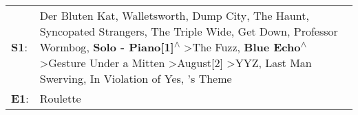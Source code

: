 \begin{supertabular}{p{0.03\textwidth}p{0.92\textwidth}}
 \textbf{S1}:  &  Der Bluten Kat\textsuperscript{}, \enspace Walletsworth\textsuperscript{}, \enspace Dump City\textsuperscript{}, \enspace The Haunt\textsuperscript{}, \enspace Syncopated Strangers\textsuperscript{}, \enspace The Triple Wide\textsuperscript{}, \enspace Get Down\textsuperscript{}, \enspace Professor Wormbog\textsuperscript{}, \enspace \textbf{Solo - Piano[1]\textsuperscript{$\wedge$}} \textgreater \enspace The Fuzz\textsuperscript{}, \enspace \textbf{Blue Echo\textsuperscript{$\wedge$}} \textgreater \enspace Gesture Under a Mitten\textsuperscript{} \textgreater \enspace August[2]\textsuperscript{} \textgreater \enspace YYZ\textsuperscript{}, \enspace Last Man Swerving\textsuperscript{}, \enspace In Violation of Yes\textsuperscript{}, 's Theme\textsuperscript{}  \enspace  \\
 \textbf{E1}:  &                                                                                                                                                                                                                                                                                                                                                                                                                                                                                                                                                                                                                                                                                                                                                                                    Roulette\textsuperscript{}  \enspace  \\
\end{supertabular}
